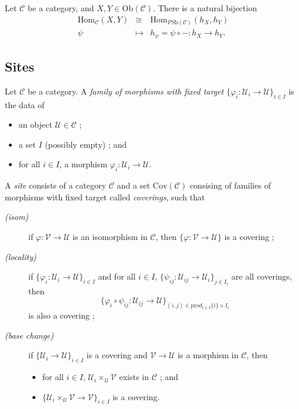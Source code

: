 \begin{lemma}[Yoneda] Let $\mathcal{C}$ be a category, and $X,Y \in \text{Ob}(\mathcal{C})$. There is a natural bijection 
$$
\begin{array}{rcl}
\text{Hom}_\mathcal{C}(X,Y) & \cong & \text{Hom}_{\textit{PSh}(\mathcal{C})} (h_X,h_Y) \\
\psi & \longmapsto & h_\psi =  \psi \circ - : h_X \to h_Y.
\end{array}
$$
\end{lemma}

\subsection{Sites}

\begin{definition}
Let $\mathcal{C}$ be a category. A \emph{family of morphisms with fixed target} $\{\varphi_i : \mathcal{U}_i \to \mathcal{U} \}_{i\in I}$ is the data of
\begin{itemize} 
\item an object $\mathcal{U} \in \mathcal{C}$ ; 
\item a set $I$ (possibly empty) ; and 
\item for all $i\in I$, a morphism $\varphi_i : \mathcal{U}_i \to \mathcal{U}$. 
\end{itemize}
A \emph{site} consists of a category $\mathcal{C}$ and a set $\text{Cov}(\mathcal{C})$ consising of families of morphisms with fixed target called \emph{coverings}, such that
\begin{description}
\item[\it(isom)]
if $\varphi : \mathcal{V} \to \mathcal{U}$ is an isomorphism in $\mathcal{C}$, then $\{\varphi : \mathcal{V} \to \mathcal{U}\}$ is a covering ;
\item[\it(locality)]
if $\{\varphi_i : \mathcal{U}_i \to \mathcal{U} \}_{i\in I}$ and for all $i \in I$, $\{\psi_{ij} : \mathcal{U}_{ij} \to \mathcal{U}_i \}_{j\in I_i}$ are all coverings, then $$\{\varphi_i \circ \psi_{ij} : \mathcal{U}_{ij} \to \mathcal{U} \}_{(i,j)\in \text{pr}od_{i\in I} \{i\} \times I_i}$$ is also a covering ;
\item[\it(base change)]
if $\{\mathcal{U}_i \to \mathcal{U} \}_{i\in I}$ is a covering and $\mathcal{V} \to \mathcal{U}$ is a morphism in $\mathcal{C}$, then
\begin{itemize}
\item for all $i \in I$, $\mathcal{U}_i \times_\mathcal{U} \mathcal{V}$ exists in $\mathcal{C}$ ; and
\item  $\{\mathcal{U}_i \times_\mathcal{U} \mathcal{V} \to \mathcal{V} \}_{i\in I}$ is a covering.
\end{itemize}
\end{description}
\end{definition}

